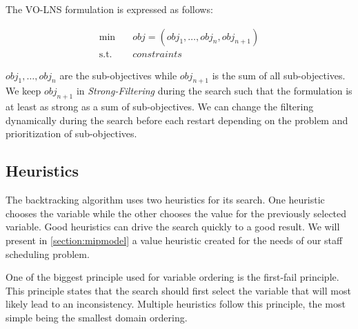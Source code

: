 \documentclass[../../thesis.tex]{subfiles}
\begin{document}
The VO-LNS formulation is expressed as follows:

\begin{align*}
  \text{min} \quad & obj = (obj_1, \dots, obj_n, obj_{n+1}) \\
  \text{s.t.} \quad & constraints 
\end{align*}

$obj_1, \dots, obj_n$ are the sub-objectives while $obj_{n+1}$ is the sum of all sub-objectives. We keep $obj_{n+1}$ in 
\emph{Strong-Filtering} during the search such that the formulation is at least as strong as a sum of sub-objectives.
We can change the filtering dynamically during the search before each restart depending on the problem and prioritization of sub-objectives.

\subsection{Heuristics}

The backtracking algorithm uses two heuristics for its search. One heuristic chooses the variable while the other chooses 
the value for the previously selected variable. Good heuristics can drive the search quickly to a good result. 
We will present in \autoref{section:mipmodel} a value heuristic created for the needs of our staff scheduling problem.


One of the biggest principle used for variable ordering is the first-fail principle. 
This principle states that the search should first select the variable that will most likely lead to 
an inconsistency. Multiple heuristics follow this principle, the most simple being the smallest domain ordering.


\end{document}
